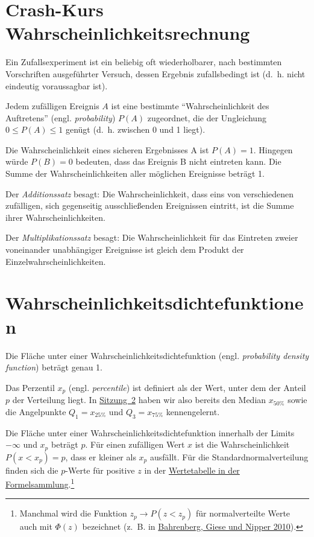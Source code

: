 \documentclass[
  11pt,
  ngerman,
  a4paper,
]{report}
\begin{document}
\hypertarget{crash-kurs-wahrscheinlichkeitsrechnung}{%
\section{Crash-Kurs Wahrscheinlichkeitsrechnung}\label{crash-kurs-wahrscheinlichkeitsrechnung}}

Ein Zufallsexperiment ist ein beliebig oft wiederholbarer, nach bestimmten Vorschriften ausgeführter Versuch, dessen Ergebnis zufallsbedingt ist (d.~h. nicht eindeutig voraussagbar ist).

Jedem zufälligen Ereignis \(A\) ist eine bestimmte \enquote{Wahrscheinlichkeit des Auftretens} (engl. \emph{probability}) \(P(A)\) zugeordnet, die der Ungleichung \(0 \leq P(A) \leq 1\) genügt (d.~h. zwischen 0 und 1 liegt).

Die Wahrscheinlichkeit eines sicheren Ergebnisses A ist \(P(A) = 1\). Hingegen würde \(P(B) = 0\) bedeuten, dass das Ereignis B nicht eintreten kann. Die Summe der Wahrscheinlichkeiten aller möglichen Ereignisse beträgt 1.

Der \emph{Additionssatz} besagt: Die Wahrscheinlichkeit, dass eins von verschiedenen zufälligen, sich gegenseitig ausschließenden Ereignissen eintritt, ist die Summe ihrer Wahrscheinlichkeiten.

Der \emph{Multiplikationssatz} besagt: Die Wahrscheinlichkeit für das Eintreten zweier voneinander unabhängiger Ereignisse ist gleich dem Produkt der Einzelwahrscheinlichkeiten.

\hypertarget{wahrscheinlichkeitsdichtefunktionen}{%
\section{Wahrscheinlichkeitsdichtefunktionen}\label{wahrscheinlichkeitsdichtefunktionen}}

Die Fläche unter einer Wahrscheinlichkeitsdichtefunktion (engl. \emph{probability density function}) beträgt genau 1.

Das Perzentil \(x_p\) (engl. \emph{percentile}) ist definiert als der Wert, unter dem der Anteil \(p\) der Verteilung liegt. In \protect\hyperlink{Mauxdfzahlen}{Sitzung~2} haben wir also bereits den Median \(x_{50\%}\) sowie die Angelpunkte \(Q_1=x_{25\%}\) und \(Q_3=x_{75\%}\) kennengelernt.

Die Fläche unter einer Wahrscheinlichkeitsdichtefunktion innerhalb der Limits \(-\infty\) und \(x_p\) beträgt \(p\). Für einen zufälligen Wert \(x\) ist die Wahrscheinlichkeit \(P(x < x_p) = p\), dass er kleiner als \(x_p\) ausfällt.
Für die Standardnormalverteilung finden sich die \(p\)-Werte für positive \(z\) in der \protect\hyperlink{tabelle-z}{Wertetabelle in der Formelsammlung}.\footnote{Manchmal wird die Funktion \(z_p \rightarrow P(z < z_p)\) für normalverteilte Werte auch mit \(\Phi(z)\) bezeichnet (z.~B. in \protect\hyperlink{ref-bahrenberg}{Bahrenberg, Giese und Nipper 2010}).}
\end{document}
